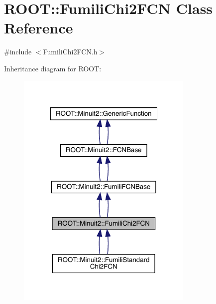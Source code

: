 \hypertarget{classROOT_1_1Minuit2_1_1FumiliChi2FCN}{}\section{R\+O\+OT\+:\+:Fumili\+Chi2\+F\+CN Class Reference}
\label{classROOT_1_1Minuit2_1_1FumiliChi2FCN}


{\ttfamily \#include $<$Fumili\+Chi2\+F\+C\+N.\+h$>$}



Inheritance diagram for R\+O\+OT\+:\nopagebreak
\begin{figure}[H]
\begin{center}
\leavevmode
\includegraphics[width=240pt]{da/d72/classROOT_1_1Minuit2_1_1FumiliChi2FCN__inherit__graph}
\end{center}
\end{figure}



